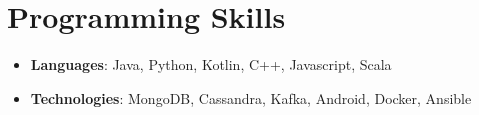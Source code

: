 \documentclass[letterpaper,11pt]{article}
\newcommand{\resumeItem}[2]{
  \item\small{
    \textbf{#1}{: #2 \vspace{-2pt}}
  }
}
\newcommand{\resumeSubItem}[2]{\resumeItem{#1}{#2}\vspace{-4pt}}
\newcommand{\resumeSubHeadingListStart}{\begin{itemize}[leftmargin=*]}
\newcommand{\resumeSubHeadingListEnd}{\end{itemize}}
\begin{document}
\section{Programming Skills}
  \resumeSubHeadingListStart
    \resumeSubItem{Languages}{Java, Python, Kotlin, C++, Javascript, Scala}
    \resumeSubItem{Technologies}{MongoDB, Cassandra, Kafka, Android, Docker, Ansible}
  \resumeSubHeadingListEnd


\end{document}

